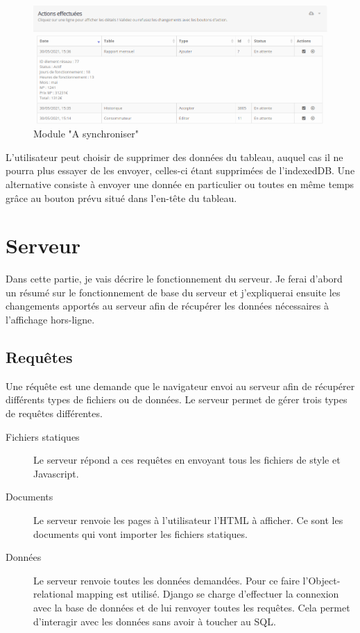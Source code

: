 \documentclass{EPL-master-thesis-covers-FR}
\begin{document}
				\begin{figure}[H]
					\centering
					\includegraphics[width=1\textwidth]{images/tosync}
					\caption{Module "A synchroniser"}
					\label{fig:tosync}
				\end{figure}
							
				L'utilisateur peut choisir de supprimer des données du tableau, auquel cas il ne pourra plus essayer de les envoyer, celles-ci étant supprimées de l'indexedDB. Une alternative consiste à envoyer une donnée en particulier ou toutes en même temps grâce au bouton prévu situé dans l'en-tête du tableau.
			
		
		\section{Serveur}
		\label{sec:serveur}
			Dans cette partie, je vais décrire le fonctionnement du serveur. Je ferai d'abord un résumé sur le fonctionnement de base du serveur et j'expliquerai ensuite les changements apportés au serveur afin de récupérer les données nécessaires à l'affichage hors-ligne.
			
			\subsection*{Requêtes}
				Une réquête est une demande que le navigateur envoi au serveur afin de récupérer différents types de fichiers ou de données. Le serveur permet de gérer trois types de requêtes différentes.
				
				\begin{description}
					\item[Fichiers statiques] Le serveur répond a ces requêtes en envoyant tous les fichiers de style et Javascript.
					\item[Documents] Le serveur renvoie les pages à l'utilisateur l'HTML à afficher. Ce sont les documents qui vont importer les fichiers statiques.
					\item[Données] Le serveur renvoie toutes les données demandées. Pour ce faire l'Object-relational mapping est utilisé. Django se charge d'effectuer la connexion avec la base de données et de lui renvoyer toutes les requêtes. Cela permet d'interagir avec les données sans avoir à toucher au SQL.
				\end{description}
\end{document}

